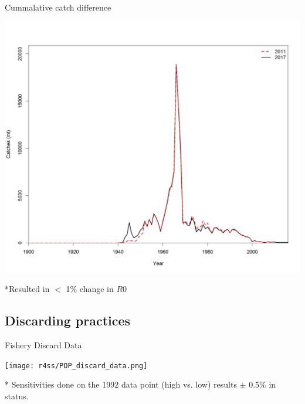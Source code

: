 \documentclass[pdf]{beamer}\usepackage[]{graphicx}\usepackage[]{color}
\begin{document}
\begin{frame}{Cummalative catch difference}
  \begin{center}
    \includegraphics[scale = 0.32, trim={0, 0, 0, 2cm}, clip]{figures/Catch_Comparison.png}
  \end{center}
  *Resulted in $<$ 1\% change in $R0$ 
\end{frame}

\subsection{Discarding practices}
\begin{frame}{Fishery Discard Data}
  \begin{center}
    \texttt{[image: r4ss/POP\_discard\_data.png]}
  \end{center}
  * \small{Sensitivities done on the 1992 data point (high vs. low) results $\pm$ 0.5\%  in status.}
\end{frame}

\end{document}
